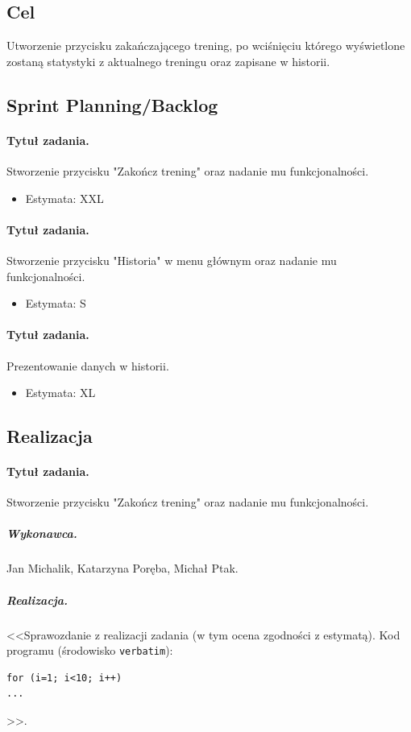 \documentclass[a4paper]{article}
\begin{document}
\subsection{Cel} Utworzenie przycisku zakańczającego trening, po wciśnięciu którego wyświetlone zostaną statystyki z aktualnego treningu oraz zapisane w historii.

\subsection{Sprint Planning/Backlog}

\paragraph{Tytuł zadania.} Stworzenie przycisku "Zakończ trening" oraz nadanie mu funkcjonalności.
\begin{itemize}
\item Estymata: XXL
\end{itemize}

\paragraph{Tytuł zadania.} Stworzenie przycisku "Historia" w menu głównym oraz nadanie mu funkcjonalności.
\begin{itemize}
\item Estymata: S
\end{itemize}

\paragraph{Tytuł zadania.} Prezentowanie danych w historii.
\begin{itemize}
\item Estymata: XL
\end{itemize}

\subsection{Realizacja}

\paragraph{Tytuł zadania.} Stworzenie przycisku "Zakończ trening" oraz nadanie mu funkcjonalności.
\subparagraph{Wykonawca.} Jan Michalik, Katarzyna Poręba, Michał Ptak.
\subparagraph{Realizacja.} <<Sprawozdanie z realizacji zadania (w tym ocena zgodności z estymatą). Kod programu (środowisko \texttt{verbatim}): \begin{verbatim}
for (i=1; i<10; i++)
...
\end{verbatim}>>.
\end{document}
